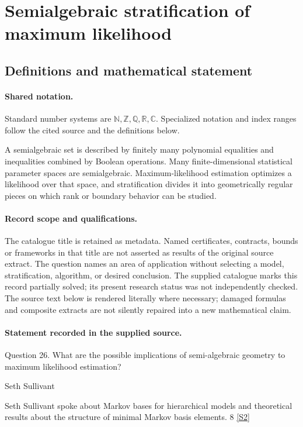 \documentclass[11pt]{article}
\newcommand{\sref}[2]{\hyperlink{source:#1:#2}{[S#2]}}
\begin{document}
\section{Semialgebraic stratification of maximum likelihood}\label{statement}

\subsection{Definitions and mathematical statement}

\paragraph{Shared notation.}Standard number systems are $\mathbb N,\mathbb Z,\mathbb Q,\mathbb R,\mathbb C$. Specialized notation and index ranges follow the cited source and the definitions below.


A semialgebraic set is described by finitely many polynomial equalities and inequalities combined by Boolean operations. Many finite-dimensional statistical parameter spaces are semialgebraic. Maximum-likelihood estimation optimizes a likelihood over that space, and stratification divides it into geometrically regular pieces on which rank or boundary behavior can be studied.
\paragraph{Record scope and qualifications.}
The catalogue title is retained as metadata. Named certificates, contracts, bounds or frameworks in that title are not asserted as results of the original source extract.
The question names an area of application without selecting a model, stratification, algorithm, or desired conclusion. The supplied catalogue marks this record partially solved; its present research status was not independently checked.
The source text below is rendered literally where necessary; damaged formulas and composite extracts are not silently repaired into a new mathematical claim.
\paragraph{Statement recorded in the supplied source.}
Question 26. What are the possible implications of semi-algebraic geometry to maximum likelihood estimation?

Seth Sullivant

Seth Sullivant spoke about Markov bases for hierarchical models and theoretical results about the structure of minimal Markov basis elements. 8 \sref{statement}{2}
\end{document}

